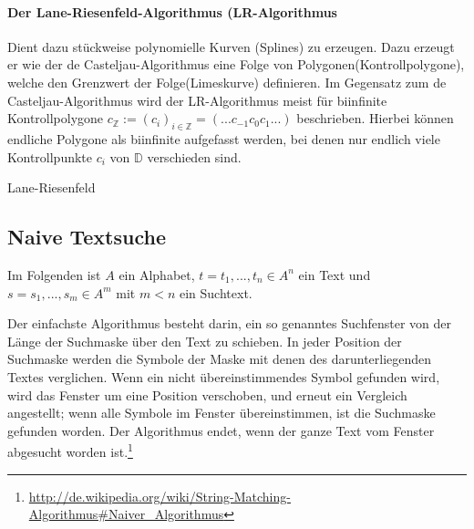 \paragraph{Der Lane-Riesenfeld-Algorithmus (LR-Algorithmus}
Dient dazu stückweise polynomielle Kurven (Splines) zu erzeugen. Dazu erzeugt er wie der de Casteljau-Algorithmus eine Folge von Polygonen(Kontrollpolygone), welche den Grenzwert der Folge(Limeskurve) definieren. Im Gegensatz zum de Casteljau-Algorithmus wird der LR-Algorithmus meist für biinfinite Kontrollpolygone $c_\mathbb{Z} := (c_i)_{i \in \mathbb{Z}} = ( ... c_{-1}c_0c_1 ...)$ beschrieben. Hierbei können endliche Polygone als biinfinite aufgefasst werden, bei denen nur endlich viele Kontrollpunkte $c_i$ von $\mathbb{D}$ verschieden sind.


\begin{algorithm}[H]
	\caption{Lane-Riesenfeld}

	\BlankLine

\end{algorithm}



\subsection{Naive Textsuche}
Im Folgenden ist \(A\) ein Alphabet, \(t = t_1,...,t_n \in A^n\) ein Text und \(s = s_1,...,s_m \in A^m\) mit \(m<n\) ein Suchtext.

Der einfachste Algorithmus besteht darin, ein so genanntes Suchfenster von der Länge der Suchmaske über den Text zu schieben. In jeder Position der Suchmaske werden die Symbole der Maske mit denen des darunterliegenden Textes verglichen. Wenn ein nicht übereinstimmendes Symbol gefunden wird, wird das Fenster um eine Position verschoben, und erneut ein Vergleich angestellt; wenn alle Symbole im Fenster übereinstimmen, ist die Suchmaske gefunden worden. Der Algorithmus endet, wenn der ganze Text vom Fenster abgesucht worden ist.\footnote{\url{http://de.wikipedia.org/wiki/String-Matching-Algorithmus\#Naiver_Algorithmus}}

